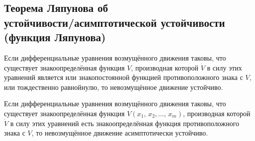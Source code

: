\documentclass[a4paper]{article}
\begin{document}
\subsection{Теорема Ляпунова об\\
	устойчивости/асимптотической устойчивости\\
(функция Ляпунова)}
\begin{thm}
	Если дифференциальные уравнения возмущённого движения таковы, что
	существует знакоопределённая функция $V$, производная которой $\dot{V}$ 
	в силу этих уравнений является  или  знакопостоянной функцией
	противоположного знака с $V$, или тождественно равнойнулю,
		то
	невозмущённое движение устойчиво.
\end{thm}
\begin{thm}
	Если дифференциальные уравнения возмущённого движения таковы, что
	существует знакоопределённая функция $V(x_1,\,x_2,\ldots,\,x_m)$,
	производная которой $\dot{V}$  в силу этих уравнений  есть
	знакоопределённая функция противоположного знака с $V$, то
	невозмущённое движение асимптотически устойчиво.
\end{thm}
\end{document}
